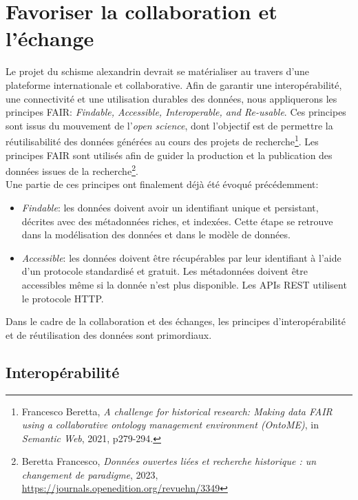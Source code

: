     
    \section{Favoriser la collaboration et l'échange}

 Le projet du schisme alexandrin devrait se matérialiser au travers d’une plateforme internationale et collaborative. Afin de garantir une interopérabilité, une connectivité et une utilisation durables des données,  nous appliquerons les principes FAIR: \textit{Findable, Accessible, Interoperable, and Re-usable}. Ces principes sont issus du mouvement de l’\textit{open science}, dont l’objectif est de permettre la réutilisabilité des données générées au cours des projets de recherche\footnote{Francesco Beretta, \textit{A challenge for historical research: Making data FAIR using a collaborative ontology management environment (OntoME)}, in \textit{Semantic Web}, 2021, p279-294.}.
Les principes FAIR sont utilisés afin de guider la production et la publication des données issues de la recherche\footnote{Beretta Francesco, \textit{Données ouvertes liées et recherche historique : un changement de paradigme}, 2023, \url{https://journals.openedition.org/revuehn/3349}}. \\
Une partie de ces principes ont finalement déjà été évoqué précédemment: \\
\begin{itemize}
\item \textit{Findable}: les données doivent avoir un identifiant unique et persistant, décrites avec des métadonnées riches, et indexées. Cette étape se retrouve dans la modélisation des données et dans le modèle de données.
\item \textit{Accessible}: les données doivent être récupérables par leur identifiant à l’aide d’un protocole standardisé et gratuit. Les métadonnées doivent être accessibles même si la donnée n’est plus disponible. Les APIs REST utilisent le protocole HTTP.\\
\end{itemize}

Dans le cadre de la collaboration et des échanges, les principes d'interopérabilité et de réutilisation des données sont primordiaux.



    \subsection{Interopérabilité}

